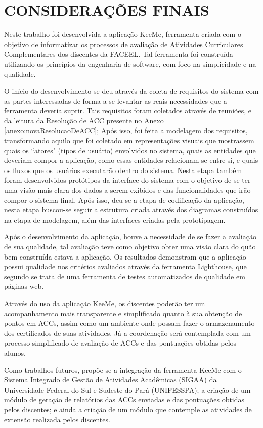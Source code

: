 
\chapter{CONSIDERAÇÕES FINAIS}
\label{chap:conclusao}

Neste trabalho foi desenvolvida a aplicação KeeMe, ferramenta criada com o objetivo de informatizar os processos de avaliação de Atividades Curriculares Complementares dos discentes da FACEEL. Tal ferramenta foi construída utilizando os princípios da engenharia de software, com foco na simplicidade e na qualidade.

O início do desenvolvimento se deu através da coleta de requisitos do sistema com as partes interessadas de forma a se levantar as reais necessidades que a ferramenta deveria suprir. Tais requisitos foram coletados através de reuniões, e da leitura da Resolução de ACC presente no Anexo \ref{anexo:novaResolucaoDeACC}; Após isso, foi feita a modelagem dos requisitos, transformando aquilo que foi coletado em representações visuais que mostrassem quais os ``atores" (tipos de usuário) envolvidos no sistema, quais as entidades que deveriam compor a aplicação, como essas entidades relacionam-se entre si, e quais os fluxos que os usuários executarão dentro do sistema. Nesta etapa também foram desenvolvidos protótipos da interface do sistema com o objetivo de se ter uma visão mais clara dos dados a serem exibidos e das funcionalidades que irão compor o sistema final. Após isso, deu-se a etapa de codificação da aplicação, nesta etapa buscou-se seguir a estrutura criada através dos diagramas construídos na etapa de modelagem, além das interfaces criadas pela prototipagem.

Após o desenvolvimento da aplicação, houve a necessidade de se fazer a avaliação de sua qualidade, tal avaliação teve como objetivo obter uma visão clara do quão bem construída estava a aplicação. Os resultados demonstram que a aplicação possui qualidade nos critérios avaliados através da ferramenta Lighthouse, que segundo \cite{lighthouse} se trata de uma ferramenta de testes automatizados de qualidade em páginas web.

Através do uso da aplicação KeeMe, os discentes poderão ter um acompanhamento mais transparente e simplificado quanto à sua obtenção de pontos em ACCs, assim como um ambiente onde possam fazer o armazenamento dos certificados de suas atividades. Já a coordenação será contemplada com um processo simplificado de avaliação de ACCs e das pontuações obtidas pelos alunos.

Como trabalhos futuros, propõe-se a integração da ferramenta KeeMe com o Sistema Integrado de Gestão de Atividades Acadêmicas (SIGAA) da Universidade Federal do Sul e Sudeste do Pará (UNIFESSPA); a criação de um módulo de geração de relatórios das ACCs enviadas e das pontuações obtidas pelos discentes; e ainda a criação de um módulo que contemple as atividades de extensão realizada pelos discentes.
